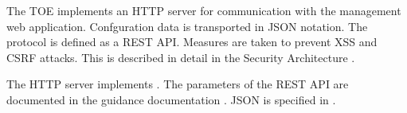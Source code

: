 The TOE implements an HTTP server for communication with the management web
application. Confguration data is transported in JSON notation. The protocol is
defined as a REST API. Measures are taken to prevent XSS and CSRF attacks. This
is described in detail in the Security Architecture \autocite{adv_arc}.



The HTTP server implements . The parameters of the REST API are
documented in the guidance documentation \autocite{agd_adm}. JSON is specified
in .


